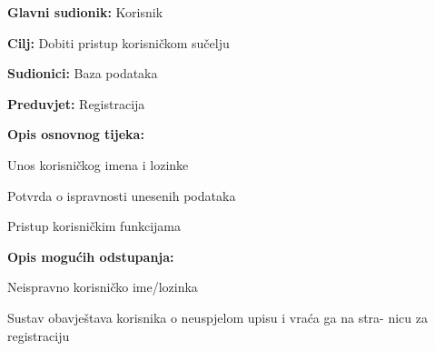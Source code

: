 					\noindent {}
					\begin{packed_item}
	
						\item \textbf{Glavni sudionik: } Korisnik
						\item  \textbf{Cilj:} Dobiti pristup korisničkom sučelju
						\item  \textbf{Sudionici:} Baza podataka
						\item  \textbf{Preduvjet:} Registracija
						\item  \textbf{Opis osnovnog tijeka:}
						
						\item[] \begin{packed_enum}
	
							\item Unos korisničkog imena i lozinke
							\item Potvrda o ispravnosti unesenih podataka
							\item Pristup korisničkim funkcijama
						\end{packed_enum}
						
						\item  \textbf{Opis mogućih odstupanja:}
						
						\item[] \begin{packed_item}
	
							\item[2.a] Neispravno korisničko ime/lozinka
							\item[] \begin{packed_enum}
								
								\item Sustav obavještava korisnika o neuspjelom upisu i vraća ga na stra- 
								nicu za registraciju
								
								
							\end{packed_enum}
							
						\end{packed_item}
					\end{packed_item}
					
